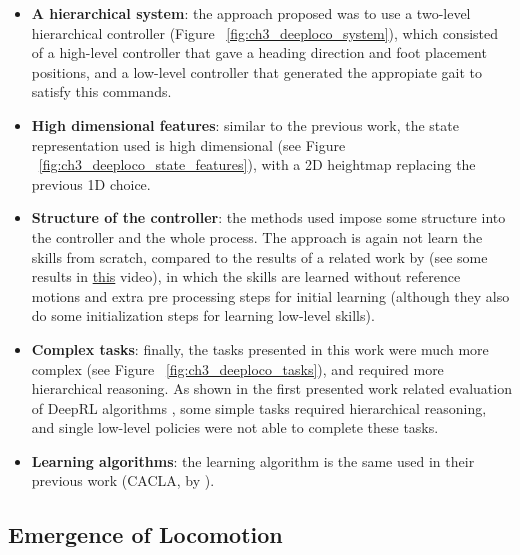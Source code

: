 \begin{itemize}
    \item \textbf{A hierarchical system}: the approach proposed was to use a two-level
          hierarchical controller (Figure ~\ref{fig:ch3_deeploco_system}), which consisted 
          of a high-level controller that gave a heading direction and foot placement 
          positions, and a low-level controller that generated the appropiate gait 
          to satisfy this commands.

          \figDeepLocoSystem

    \item \textbf{High dimensional features}: similar to the previous work, the state
          representation used is high dimensional (see Figure ~\ref{fig:ch3_deeploco_state_features}), 
          with a 2D heightmap replacing the previous 1D choice.

          \figDeepLocoStateFeatures

    \item \textbf{Structure of the controller}: the methods used impose some structure
          into the controller and the whole process. The approach is again not learn
          the skills from scratch, compared to the results of a related work by
          \cite{HeessLearningAndTransfer} (see some results in \href{https://youtu.be/sboPYvhpraQ?t=34}{this} video), 
          in which the skills are learned without reference motions and extra pre processing
          steps for initial learning (although they also do some initialization steps
          for learning low-level skills).

    \item \textbf{Complex tasks}: finally, the tasks presented in this work were
          much more complex (see Figure ~\ref{fig:ch3_deeploco_tasks}), and required
          more hierarchical reasoning. As shown in the first presented work related evaluation
          of DeepRL algorithms \citep{Rllab}, some simple tasks required hierarchical
          reasoning, and single low-level policies were not able to complete these tasks.

    \item \textbf{Learning algorithms}: the learning algorithm is the same used in
          their previous work (CACLA, by \citeauthor{CACLA}).

\end{itemize}

\subsection{Emergence of Locomotion}

